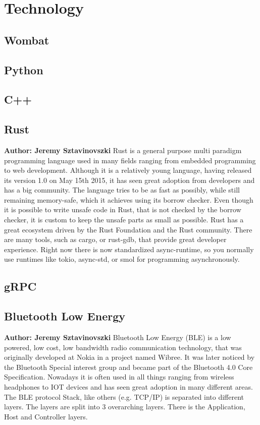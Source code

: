 \chapter{Technology}


\section{Wombat}

\section{Python}

\section{C++}

\section{Rust}
\textbf{Author: Jeremy Sztavinovszki}
Rust is a general purpose multi paradigm programming language used in many fields ranging from embedded programming to web development. Although it is a relatively young language, having released its version 1.0 on May 15th 2015, it has seen great adoption from developers and has a big community. The language tries to be as fast as possibly, while still remaining memory-safe, which it achieves using its borrow checker. Even though it is possible to write unsafe code in Rust, that is not checked by the borrow checker, it is custom to keep the unsafe parts as small as possible.
Rust has a great ecosystem driven by the Rust Foundation and the Rust community. There are many tools, such as cargo, or rust-gdb, that provide great developer experience.
Right now there is now standardized async-runtime, so you normally use runtimes like tokio, async-std, or smol for programming asynchronously.

\section{gRPC}

\section{Bluetooth Low Energy}
\textbf{Author: Jeremy Sztavinovszki}
Bluetooth Low Energy (BLE) is a low powered, low cost, low bandwidth radio communication technology, that was originally developed at Nokia in a project named Wibree. It was later noticed by the Bluetooth Special interest group and became part of the Bluetooth 4.0 Core Specification. Nowadays it is often used in all things ranging from wireless headphones to IOT devices and has seen great adoption in many different areas. The BLE protocol Stack, like others (e.g. TCP/IP) is separated into different layers. The layers are split into 3 overarching layers. There is the Application, Host and Controller layers.

